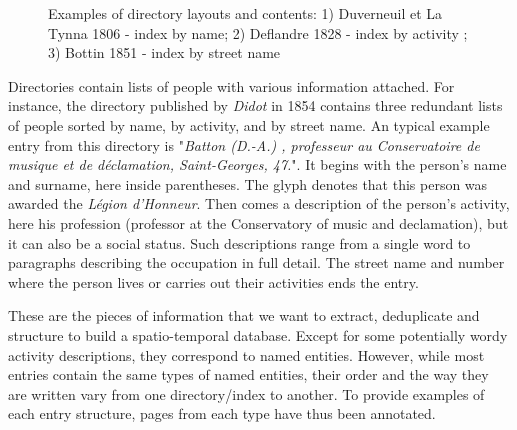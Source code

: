\begin{figure}[htb!]
	  \caption{\label{fig:directories} Examples of directory layouts and contents: 1) Duverneuil et La Tynna 1806 - index by name; 2) Deflandre 1828 - index by activity ; 3) Bottin 1851 - index by street name}
\end{figure}


Directories contain lists of people with various information attached.
For instance, the directory published by \emph{Didot} in 1854 contains three redundant lists of people sorted by name, by activity, and by street name.
An typical example entry from this directory is "\textit{Batton (D.-A.) , professeur au Conservatoire de musique et de déclamation, Saint-Georges, 47.}".
It begins with the person's name and surname, here inside parentheses.
The glyph denotes that this person was awarded the \textit{Légion d'Honneur}.
Then comes a description of the person's activity, here his profession (professor at the Conservatory of music and declamation), but it can also be a social status.
Such descriptions range from a single word to paragraphs describing the occupation in full detail.
The street name and number where the person lives or carries out their activities ends the entry.

These are the pieces of information that we want to extract, deduplicate  and structure to build a spatio-temporal database.
Except for some potentially wordy activity descriptions, they correspond to named entities. However, while most entries contain the same types of named entities, their order and the way they are written vary from one directory/index to another. To provide examples of each entry structure, pages from each type have thus been annotated. %


